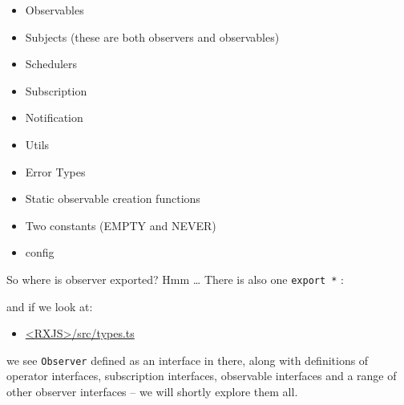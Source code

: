 \begin{itemize}
  \item Observables
  \item Subjects (these are both observers and observables)
  \item Schedulers
  \item Subscription
  \item Notification
  \item Utils
  \item Error Types
  \item Static observable creation functions
  \item Two constants (EMPTY and NEVER)
  \item config
\end{itemize}

So where is observer exported? Hmm … There is also one
\texttt{export *}
:



and if we look at:

\begin{itemize}
  \item \href{https://github.com/ReactiveX/rxjs/blob/master/src/internal/types.ts}
        {<RXJS>/src/types.ts}
\end{itemize}

we see
\texttt{Observer}
defined as an interface in there, along with definitions of operator
interfaces, subscription interfaces, observable interfaces and a range of other
observer interfaces – we will shortly explore them all.
